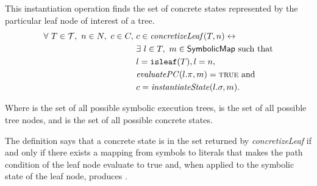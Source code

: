 \begin{mydefinition}
  \label{def:concleaf}

  This instantiation operation finds the set of concrete states represented by
  the particular leaf node of interest of a tree.
  \begin{align*}
\forall ~T \in \mathcal{T},~n \in N,~c \in C,~& c \in
\mathit{concretizeLeaf}(T,n) \leftrightarrow \\
&\exists~ l \in T,~ m \in \textsf{SymbolicMap} \mathrm{~such~that}\\
&l = \mathtt{isleaf}(T), l = n,\\
&\mathit{evaluatePC}(l.\pi, m) = \mathtt{\textsc{true}}~\mathrm{and}  \\
&c = \mathit{instantiateState}(l.\sigma, m).
    \end{align*}
\end{mydefinition}



Where \trees{} is the set of all possible symbolic execution trees, \nodes{} is
the set of all possible tree nodes, and
\concstates{} is the set of all possible concrete states.


The definition says that a concrete state \concstate{} is in the set returned by
\emph{concretizeLeaf} if and only if there exists a mapping from symbols to
literals that makes the path condition of the leaf node evaluate to true and,
when applied to the symbolic state of the leaf node, produces \concstate{}.

